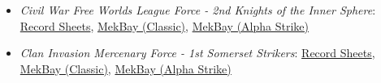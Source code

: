 \begin{itemize}
\item \emph{Civil War Free Worlds League Force - 2nd Knights of the Inner Sphere}: \href{https://raw.githubusercontent.com/Eudicods/outworlds-wastes/rules-pdf/free-worlds-league.pdf}{Record Sheets}, \href{https://mekbay.com/?units=Outworlds%20Wastes~BMWarhammer_WHM8D:4:4,BMWraith_TR2,BMPhoenixHawk_PXH3M,BMWasp_WSP3M,CVMaximHeavyHoverTransport_BAFactoryUpgrade,CVMaximHeavyHoverTransport_BAFactoryUpgrade,CVGalleonLightTank_GAL102,CVGalleonLightTank_GAL102,CVHarasserMissilePlatform_LRM,CVHarasserMissilePlatform_LRM,BAPhalanxBattleArmor_ASqd4,BALonginusBattleArmor_LaserSqd4,BALonginusBattleArmor_LaserSqd4,BAAchileusLightBattleArmor_LaserSqd4&name=2nd%20Knights%20of%20the%20Inner%20Sphere&gs=cbt}{MekBay (Classic)}, \href{https://mekbay.com/?units=Outworlds%20Wastes~BMWarhammer_WHM8D:4:4,BMWraith_TR2,BMPhoenixHawk_PXH3M,BMWasp_WSP3M,CVMaximHeavyHoverTransport_BAFactoryUpgrade,CVMaximHeavyHoverTransport_BAFactoryUpgrade,CVGalleonLightTank_GAL102,CVGalleonLightTank_GAL102,CVHarasserMissilePlatform_LRM,CVHarasserMissilePlatform_LRM,BAPhalanxBattleArmor_ASqd4,BALonginusBattleArmor_LaserSqd4,BALonginusBattleArmor_LaserSqd4,BAAchileusLightBattleArmor_LaserSqd4&name=2nd%20Knights%20of%20the%20Inner%20Sphere&gs=as}{MekBay (Alpha Strike)}

\item \emph{Clan Invasion Mercenary Force - 1st Somerset Strikers}: \href{https://raw.githubusercontent.com/Eudicods/outworlds-wastes/rules-pdf/somerset-strikers.pdf}{Record Sheets}, \href{https://mekbay.com/?units=Outworlds%20Wastes~BMAxman_AXM3S,BMMauler_MAL2R,BMBushwacker_BSWX2,BMWolfhound_WLF1,BMHatamotoChi_HTM27T,AFCorsair_CSRV14,CVKarnovURTransport_3055Upgrade,CVKarnovURTransport_3055Upgrade,CVKarnovURTransport_3055Upgrade,CVKarnovURTransport_3055Upgrade,BAISStandardBattleArmor_LaserSqd4,BAISStandardBattleArmor_LaserSqd4,BAISStandardBattleArmor_LaserSqd4,BAISStandardBattleArmor_LaserSqd4&name=Somerset%20Strikers&gs=cbt}{MekBay (Classic)}, \href{https://mekbay.com/?units=Outworlds%20Wastes~BMAxman_AXM3S,BMMauler_MAL2R,BMBushwacker_BSWX2,BMWolfhound_WLF1,BMHatamotoChi_HTM27T,AFCorsair_CSRV14,CVKarnovURTransport_3055Upgrade,CVKarnovURTransport_3055Upgrade,CVKarnovURTransport_3055Upgrade,CVKarnovURTransport_3055Upgrade,BAISStandardBattleArmor_LaserSqd4,BAISStandardBattleArmor_LaserSqd4,BAISStandardBattleArmor_LaserSqd4,BAISStandardBattleArmor_LaserSqd4&name=Somerset%20Strikers&gs=as}{MekBay (Alpha Strike)}


\end{itemize}

